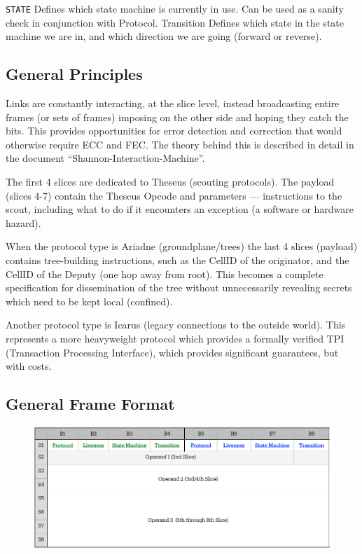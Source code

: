 \documentclass[../OAE-SPEC-MAIN.tex]{subfiles}
\begin{document}
\texttt{STATE} Defines which state machine is currently in use. Can be used as a sanity check in conjunction with Protocol.
Transition  Defines which state in the state machine we are in, and which direction we are going (forward or reverse).

\subsection{General Principles}

Links are constantly interacting, at the slice level, instead broadcasting entire frames (or sets of frames) imposing on the other side and hoping they catch the bits. This provides opportunities for error detection and correction that would otherwise require ECC and FEC. The theory behind this is described in detail in the document “Shannon-Interaction-Machine”. 

The first 4 slices are dedicated to Theseus (scouting protocols). The payload (slices 4-7) contain the Theseus Opcode and parameters — instructions to the scout, including what to do if it encounters an exception (a software or hardware hazard).

When the protocol type is Ariadne (groundplane/trees) the last 4 slices (payload) contains tree-building instructions, such as the CellID of the originator, and the CellID of the Deputy (one hop away from root). This becomes a complete specification for dissemination of the tree without unnecessarily revealing secrets which need to be kept local (confined).

Another protocol type is Icarus (legacy connections to the outside world). This represents a more heavyweight protocol which provides a formally verified TPI (Transaction Processing Interface), which provides significant guarantees, but with costs.

\subsection{General Frame Format}

   \begin{figure}
\includegraphics[width=1.5\linewidth]{./figures/General-Frame.pdf}
\end{figure}
\end{document}
